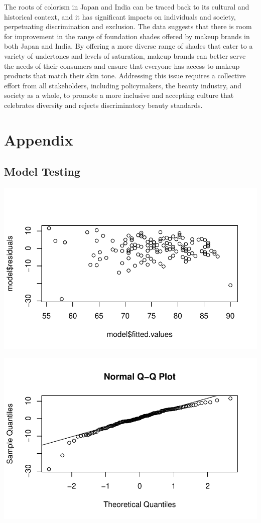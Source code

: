 \documentclass[
  letterpaper,
  DIV=11,
  numbers=noendperiod]{scrartcl}
\begin{document}
The roots of colorism in Japan and India can be traced back to its
cultural and historical context, and it has significant impacts on
individuals and society, perpetuating discrimination and exclusion. The
data suggests that there is room for improvement in the range of
foundation shades offered by makeup brands in both Japan and India. By
offering a more diverse range of shades that cater to a variety of
undertones and levels of saturation, makeup brands can better serve the
needs of their consumers and ensure that everyone has access to makeup
products that match their skin tone. Addressing this issue requires a
collective effort from all stakeholders, including policymakers, the
beauty industry, and society as a whole, to promote a more inclusive and
accepting culture that celebrates diversity and rejects discriminatory
beauty standards.

\newpage

\hypertarget{appendix}{%
\section{Appendix}\label{appendix}}

\hypertarget{model-testing}{%
\subsection{Model Testing}\label{model-testing}}

\includegraphics{paper_files/figure-pdf/unnamed-chunk-9-1.pdf}

\includegraphics{paper_files/figure-pdf/unnamed-chunk-9-2.pdf}
\end{document}
